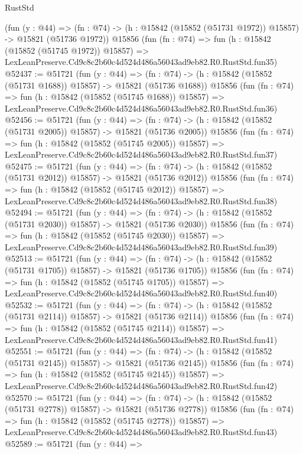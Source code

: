 \begin{lexlean}{RustStd}
\begin{coremodule}
    (fun (y : @44) =>
    (fn : @74) -> (h : @15842 (@15852 (@51731 @1972)) @15857) -> @15821 (@51736 @1972))
    @15856
    (fun (fn : @74) =>
    fun (h : @15842 (@15852 (@51745 @1972)) @15857) =>
    LexLeanPreserve.Cd9c8c2b60c4d524d486a56043ad9eb82.R0.RustStd.fun35)
@52437 := @51721
    (fun (y : @44) =>
    (fn : @74) -> (h : @15842 (@15852 (@51731 @1688)) @15857) -> @15821 (@51736 @1688))
    @15856
    (fun (fn : @74) =>
    fun (h : @15842 (@15852 (@51745 @1688)) @15857) =>
    LexLeanPreserve.Cd9c8c2b60c4d524d486a56043ad9eb82.R0.RustStd.fun36)
@52456 := @51721
    (fun (y : @44) =>
    (fn : @74) -> (h : @15842 (@15852 (@51731 @2005)) @15857) -> @15821 (@51736 @2005))
    @15856
    (fun (fn : @74) =>
    fun (h : @15842 (@15852 (@51745 @2005)) @15857) =>
    LexLeanPreserve.Cd9c8c2b60c4d524d486a56043ad9eb82.R0.RustStd.fun37)
@52475 := @51721
    (fun (y : @44) =>
    (fn : @74) -> (h : @15842 (@15852 (@51731 @2012)) @15857) -> @15821 (@51736 @2012))
    @15856
    (fun (fn : @74) =>
    fun (h : @15842 (@15852 (@51745 @2012)) @15857) =>
    LexLeanPreserve.Cd9c8c2b60c4d524d486a56043ad9eb82.R0.RustStd.fun38)
@52494 := @51721
    (fun (y : @44) =>
    (fn : @74) -> (h : @15842 (@15852 (@51731 @2030)) @15857) -> @15821 (@51736 @2030))
    @15856
    (fun (fn : @74) =>
    fun (h : @15842 (@15852 (@51745 @2030)) @15857) =>
    LexLeanPreserve.Cd9c8c2b60c4d524d486a56043ad9eb82.R0.RustStd.fun39)
@52513 := @51721
    (fun (y : @44) =>
    (fn : @74) -> (h : @15842 (@15852 (@51731 @1705)) @15857) -> @15821 (@51736 @1705))
    @15856
    (fun (fn : @74) =>
    fun (h : @15842 (@15852 (@51745 @1705)) @15857) =>
    LexLeanPreserve.Cd9c8c2b60c4d524d486a56043ad9eb82.R0.RustStd.fun40)
@52532 := @51721
    (fun (y : @44) =>
    (fn : @74) -> (h : @15842 (@15852 (@51731 @2114)) @15857) -> @15821 (@51736 @2114))
    @15856
    (fun (fn : @74) =>
    fun (h : @15842 (@15852 (@51745 @2114)) @15857) =>
    LexLeanPreserve.Cd9c8c2b60c4d524d486a56043ad9eb82.R0.RustStd.fun41)
@52551 := @51721
    (fun (y : @44) =>
    (fn : @74) -> (h : @15842 (@15852 (@51731 @2145)) @15857) -> @15821 (@51736 @2145))
    @15856
    (fun (fn : @74) =>
    fun (h : @15842 (@15852 (@51745 @2145)) @15857) =>
    LexLeanPreserve.Cd9c8c2b60c4d524d486a56043ad9eb82.R0.RustStd.fun42)
@52570 := @51721
    (fun (y : @44) =>
    (fn : @74) -> (h : @15842 (@15852 (@51731 @2778)) @15857) -> @15821 (@51736 @2778))
    @15856
    (fun (fn : @74) =>
    fun (h : @15842 (@15852 (@51745 @2778)) @15857) =>
    LexLeanPreserve.Cd9c8c2b60c4d524d486a56043ad9eb82.R0.RustStd.fun43)
@52589 := @51721
    (fun (y : @44) =>

\end{coremodule}
\end{lexlean}
